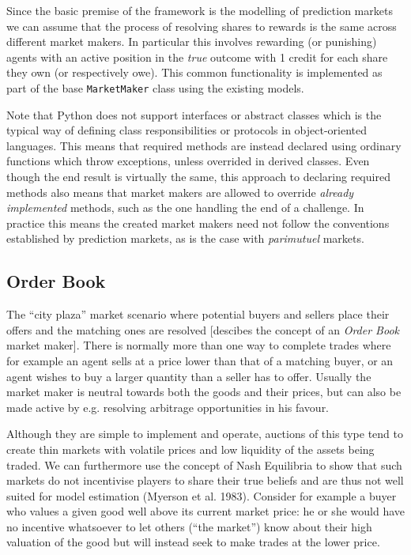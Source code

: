 \documentclass[bsc,frontabs,twoside,singlespacing,parskip,deptreport]{infthesis}     %
\begin{document}
Since the basic premise of the framework is the modelling of prediction markets we can assume that the process of resolving shares to rewards is the same across different market makers. In particular this involves rewarding (or punishing) agents with an active position in the {\it true} outcome with 1 credit for each share they own (or respectively owe). This common functionality is implemented as part of the base {\tt MarketMaker} class using the existing models. 

	 Note that Python does not support interfaces or abstract classes which is the typical way of defining class responsibilities or protocols in object-oriented languages. This means that required methods are instead declared using ordinary functions which throw exceptions, unless overrided in derived classes. Even though the end result is virtually the same, this approach to declaring required methods also means that market makers are allowed to override {\it already implemented} methods, such as the one handling the end of a challenge. In practice this means the created market makers need not follow the conventions established by prediction markets, as is the case with {\it parimutuel} markets. 


\subsection{Order Book}
    
    The “city plaza” market scenario where potential buyers and sellers place their offers and the matching ones are resolved [descibes the concept of an {\em Order Book} market maker]. There is normally more than one way to complete trades where for example an agent sells at a price lower than that of a matching buyer, or an agent wishes to buy a larger quantity than a seller has to offer. Usually the market maker is neutral towards both the goods and their prices, but can also be made active by e.g. resolving arbitrage opportunities in his favour.

    Although they are simple to implement and operate, auctions of this type tend to create thin markets with volatile prices and low liquidity of the assets being traded. We can furthermore use the concept of Nash Equilibria to show that such markets do not incentivise players to share their true beliefs and are thus not well suited for model estimation (Myerson et al. 1983). Consider for example a buyer who values a given good well above its current market price: he or she would have no incentive whatsoever to let others (“the market”) know about their high valuation of the good but will instead seek to make trades at the lower price.
\end{document}
